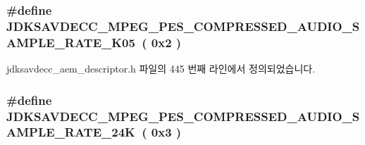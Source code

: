 \subsubsection[{\texorpdfstring{J\+D\+K\+S\+A\+V\+D\+E\+C\+C\+\_\+\+M\+P\+E\+G\+\_\+\+P\+E\+S\+\_\+\+C\+O\+M\+P\+R\+E\+S\+S\+E\+D\+\_\+\+A\+U\+D\+I\+O\+\_\+\+S\+A\+M\+P\+L\+E\+\_\+\+R\+A\+T\+E\+\_\+22\+K05}{JDKSAVDECC_MPEG_PES_COMPRESSED_AUDIO_SAMPLE_RATE_22K05}}]{\setlength{\rightskip}{0pt plus 5cm}\#define J\+D\+K\+S\+A\+V\+D\+E\+C\+C\+\_\+\+M\+P\+E\+G\+\_\+\+P\+E\+S\+\_\+\+C\+O\+M\+P\+R\+E\+S\+S\+E\+D\+\_\+\+A\+U\+D\+I\+O\+\_\+\+S\+A\+M\+P\+L\+E\+\_\+\+R\+A\+T\+E\+\_\+K05~( 0x2 )}\hypertarget{group__mpeg__pes__compressed__audio__sample__rate_ga1c10355dff452f4a6133186edb073673}{}\label{group__mpeg__pes__compressed__audio__sample__rate_ga1c10355dff452f4a6133186edb073673}


jdksavdecc\+\_\+aem\+\_\+descriptor.\+h 파일의 445 번째 라인에서 정의되었습니다.

\subsubsection[{\texorpdfstring{J\+D\+K\+S\+A\+V\+D\+E\+C\+C\+\_\+\+M\+P\+E\+G\+\_\+\+P\+E\+S\+\_\+\+C\+O\+M\+P\+R\+E\+S\+S\+E\+D\+\_\+\+A\+U\+D\+I\+O\+\_\+\+S\+A\+M\+P\+L\+E\+\_\+\+R\+A\+T\+E\+\_\+24K}{JDKSAVDECC_MPEG_PES_COMPRESSED_AUDIO_SAMPLE_RATE_24K}}]{\setlength{\rightskip}{0pt plus 5cm}\#define J\+D\+K\+S\+A\+V\+D\+E\+C\+C\+\_\+\+M\+P\+E\+G\+\_\+\+P\+E\+S\+\_\+\+C\+O\+M\+P\+R\+E\+S\+S\+E\+D\+\_\+\+A\+U\+D\+I\+O\+\_\+\+S\+A\+M\+P\+L\+E\+\_\+\+R\+A\+T\+E\+\_\+24K~( 0x3 )}\hypertarget{group__mpeg__pes__compressed__audio__sample__rate_ga18de6af46aad4d685b488fb1f9d72834}{}\label{group__mpeg__pes__compressed__audio__sample__rate_ga18de6af46aad4d685b488fb1f9d72834}


